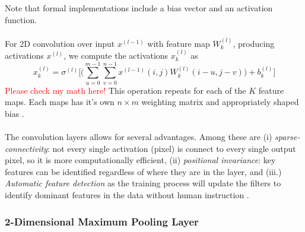 \documentclass[12pt,letterpaper]{article}
\begin{document}
Note that formal implementations include a bias vector and an activation function.

\paragraph*{}For 2D convolution over input $x^{(l-1)}$ with feature map $W^{(l)}_k$, producing activations $x^{(l)}$, we compute the activations $x^{(l)}_{k}$ as \cite{Goodfellow}
\begin{equation}
\label{eqn-ConvFeedForward}
x^{(l)}_k = \sigma^{(l)}\bigg[ \Big( \sum_{u=0}^{m-1} \sum_{v=0}^{n-1} x^{(l-1)}(i,j) W^{(l)}_k(i - u,j - v) \Big) + b^{(l)}_k \bigg]
\end{equation}
\textcolor{red}{Please check my math here!}
This operation repeats for each of the $K$ feature maps. Each maps has it's own $n \times m$ weighting matrix and appropriately shaped bias .

\paragraph*{}The convolution layers allows for several advantages. Among these are (i) \textit{sparse-connectivity}: not every single activation (pixel) is connect to every single output pixel, so it is more computationally efficient, (ii) \textit{positional invariance}: key features can be identified regardless of where they are in the layer, and (iii.) \textit{Automatic feature detection} as the training process will update the filters to identify dominant features in the data without human instruction \cite{Geron,Goodfellow,Loy}.


\subsubsection{2-Dimensional Maximum Pooling Layer}
\end{document}
